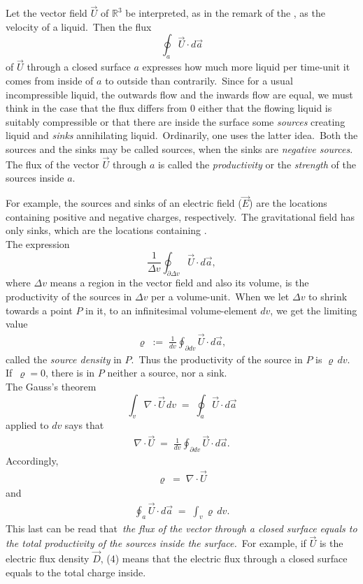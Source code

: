 \documentclass[12pt]{article}
\theoremstyle{definition}
\begin{document}
  

Let the vector field $\vec{U}$ of $\mathbb{R}^3$ be interpreted, as in the remark of the , as the velocity  of a liquid.\, Then the flux 
\[
\oint_a\vec{U}\cdot d\vec{a}
\]
of $\vec{U}$ through a closed surface $a$ expresses how much more liquid per time-unit it comes from inside of $a$ to outside than contrarily.\, Since for a usual incompressible liquid, the outwards flow and the inwards flow are equal, we must think in the case that the flux differs from 0 either that the flowing liquid is suitably compressible or that there are inside the surface some {\em sources} creating liquid and {\em sinks} annihilating liquid.\, Ordinarily, one uses the latter idea.\, Both the sources and the sinks may be called sources, when the sinks are {\em negative sources}.\, The flux of the vector $\vec{U}$ through $a$ is called the {\em productivity} or the {\em strength} of the sources inside $a$.

For example, the sources and sinks of an electric field ($\vec{E}$) are the locations containing positive and negative charges, respectively.\, The gravitational field has only sinks, which are the locations containing .\\

The expression
\[
\frac{1}{\Delta v}\oint_{\partial\Delta v}\vec{U}\cdot d\vec{a},
\]
where $\Delta v$ means a region in the vector field and also its volume, is the productivity of the sources in 
$\Delta v$ per a volume-unit.\, When we let $\Delta v$ to shrink towards a point $P$ in it, to an infinitesimal volume-element $dv$, we get the limiting value
\begin{align}
\varrho \;:=\; \frac{1}{dv}\oint_{\partial dv}\vec{U}\cdot d\vec{a},
\end{align}
called the {\em source density} in $P$.\, Thus the productivity of the source in $P$ is $\varrho\,dv$.\, If\, 
$\varrho = 0$, there is in $P$ neither a source, nor a sink.\\

The Gauss's theorem
\[
\int_v\nabla\cdot\vec{U}\,dv \;=\; \oint_a\vec{U}\cdot d\vec{a}
\]
applied to $dv$ says that
\begin{align}
\nabla\cdot\vec{U} \;=\; \frac{1}{dv}\oint_{\partial dv}\vec{U}\cdot d\vec{a}.
\end{align}
Accordingly,
\begin{align}
\varrho \;=\; \nabla\cdot\vec{U}
\end{align}
and
\begin{align}
\oint_{a}\vec{U}\cdot d\vec{a} \;=\; \int_v\varrho\,dv.
\end{align}
This last  can be read that\, {\em the flux of the vector through a closed surface equals to the total productivity of the sources inside the surface.}\, For example, if $\vec{U}$ is the electric flux density 
$\vec{D}$, (4) means that the electric flux through a closed surface equals to the total charge inside.

\end{document}
